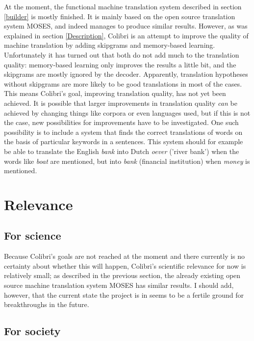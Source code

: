 \documentclass[12pt]{article}
\begin{document}
At the moment, the functional machine translation system described in section \ref{builder} is mostly finished. It is mainly based on the open source translation system MOSES, and indeed manages to produce similar results. However, as was explained in section \ref{Description}, Colibri is an attempt to improve the quality of machine translation by adding skipgrams and memory-based learning. Unfortunately it has turned out that both do not add much to the translation quality: memory-based learning only improves the results a little bit, and the skipgrams are mostly ignored by the decoder. Apparently, translation hypotheses without skipgrams are more likely to be good translations in most of the cases. \\\indent
This means Colibri's goal, improving translation quality, has not yet been achieved. It is possible that larger improvements in translation quality \emph{can} be achieved by changing things like corpora or even languages used, but if this is not the case, new possibilities for improvements have to be investigated. One such possibility is to include a system that finds the correct translations of words on the basis of particular keywords in a sentences. This system should for example be able to translate the English \emph{bank} into Dutch \emph{oever} ('river bank') when the words like \emph{boat} are mentioned, but into \emph{bank} (financial institution) when \emph{money} is mentioned.




\section{Relevance}

\subsection{For science}

Because Colibri's goals are not reached at the moment and there currently is no certainty about whether this will happen, Colibri's scientific relevance for now is relatively small; as described in the previous section, the already existing open source machine translation system MOSES has similar results. I should add, however, that the current state the project is in seems to be a fertile ground for breakthroughs in the future. 

\subsection{For society} \label{soc}
\end{document}
